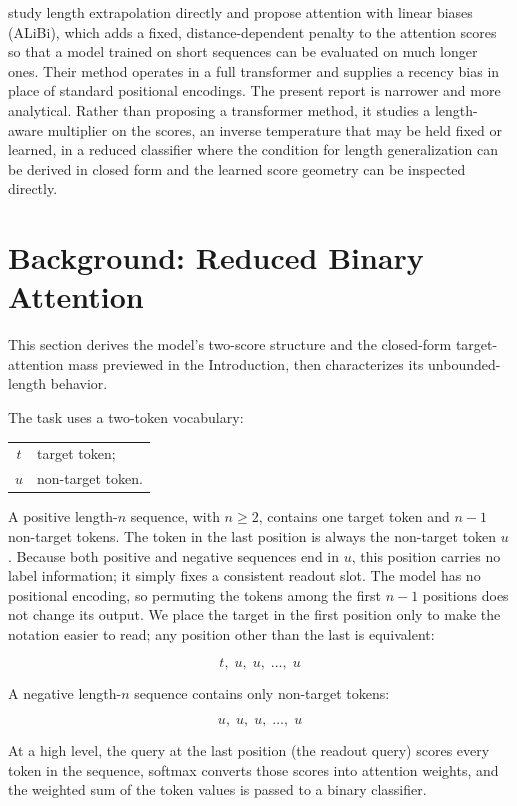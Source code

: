 \documentclass{article}
\begin{document}
\citet{press2022train} study length extrapolation directly and propose attention
with linear biases (ALiBi), which adds a fixed, distance-dependent penalty to
the attention scores so that a model trained on short sequences can be
evaluated on much longer ones. Their method operates in a full transformer and
supplies a recency bias in place of standard positional encodings. The present
report is narrower and more analytical. Rather than proposing a transformer
method, it studies a length-aware multiplier on the scores, an inverse
temperature that may be held fixed or learned, in a reduced classifier where
the condition for length generalization can be derived in closed form and the
learned score geometry can be inspected directly.

\section{Background: Reduced Binary Attention}
\label{sec:background}

This section derives the model's two-score structure and the closed-form
target-attention mass previewed in the Introduction, then characterizes its
unbounded-length behavior.

The task uses a two-token vocabulary:

\begin{center}
  \begin{tabular}{@{}cl@{}}
    $t$ & target token; \\
    $u$ & non-target token.
  \end{tabular}
\end{center}

A positive length-$n$ sequence, with $n\geq2$, contains one target token and
$n-1$ non-target tokens. The token in the last position is always the
non-target token $u$. Because both positive and negative sequences end in $u$,
this position carries no label information; it simply fixes a consistent
readout slot. The model has no positional encoding, so permuting the tokens
among the first $n-1$ positions does not change its output. We place the target
in the first position only to make the notation easier to read; any position
other than the last is equivalent:

\[
  t,\;u,\;u,\;\ldots,\;u
\]

A negative length-$n$ sequence contains only non-target tokens:

\[
  u,\;u,\;u,\;\ldots,\;u
\]

At a high level, the query at the last position (the readout query) scores every
token in the sequence, softmax converts those scores into attention weights,
and the weighted sum of the token values is passed to a binary classifier.
\end{document}

